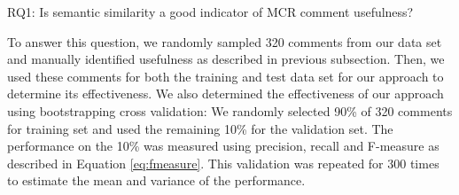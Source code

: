 %
%
%
%
%
%
%

\begin{ResearchQuestions}
\item[RQ1:] Is semantic similarity a good indicator of MCR comment usefulness?
\end{ResearchQuestions}

To answer this question, we randomly sampled 320 comments from our data set and manually identified usefulness as described in previous subsection.
Then, we used these comments for both the training and test data set for our approach to determine its effectiveness.
We also determined the effectiveness of our approach using bootstrapping cross validation:
We randomly selected 90\% of 320 comments for training set and used the remaining 10\% for the validation set.
The performance on the 10\% was measured using precision, recall and F-measure as described in Equation \ref{eq:fmeasure}.
This validation was repeated for 300 times to estimate the mean and variance of the performance.

